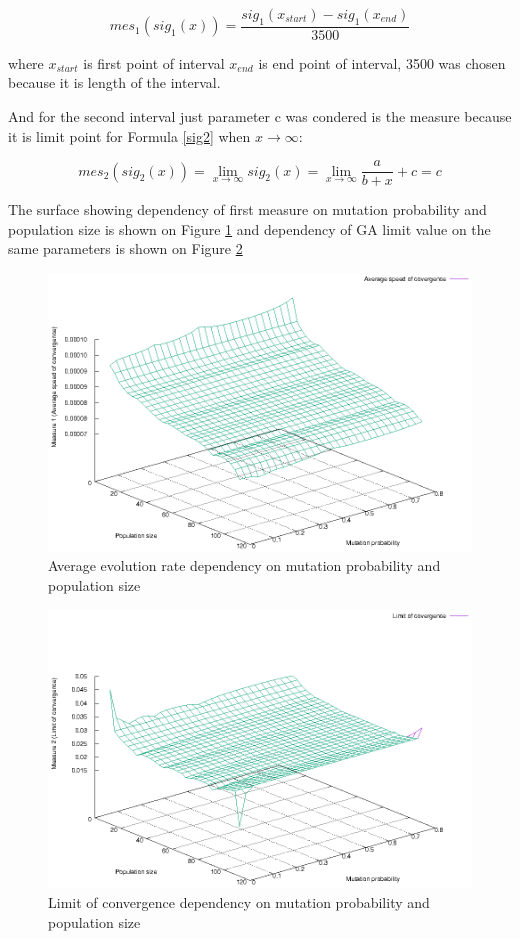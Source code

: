 \documentclass[12pt]{report}
\begin{document}
\begin{equation} \label{mes1}
mes_1(sig_1(x)) = \frac{sig_1(x_{start}) - sig_1({x_{end}})}{3500}
\end{equation}
\bigbreak
 
where $x_{start}$ is first point of interval $x_{end}$ is end point of interval, 3500 was chosen because it is length of the interval.

And for the second interval just parameter c was condered is the measure because it is limit point for Formula \ref{sig2} when $x \rightarrow \infty$:

\begin{equation} \label{mes2}
mes_2(sig_2(x)) = \lim_{x\to\infty} sig_2(x) = \lim_{x\to\infty}  \frac{a}{b+x}+c = c
\end{equation}
\bigbreak

The surface showing dependency of first measure on mutation probability and population size is shown on Figure \ref{speedsurface} and dependency of GA limit value on the same parameters is shown on Figure \ref{limitsurface}

\begin{figure}
    \centering
    \includegraphics[width=5.0in]{speed_surface}
    \caption{Average evolution rate dependency on mutation probability and population size}
    \label{speedsurface}
\end{figure}

\begin{figure}
    \centering
    \includegraphics[width=5.0in]{limit_surface}
    \caption{Limit of convergence dependency on mutation probability and population size}
    \label{limitsurface}
\end{figure}
\end{document}

